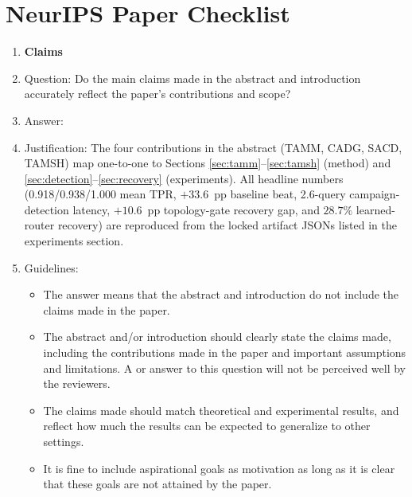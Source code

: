 \section*{NeurIPS Paper Checklist}

\begin{enumerate}

\item {\bf Claims}
    \item[] Question: Do the main claims made in the abstract and introduction accurately reflect the paper's contributions and scope?
    \item[] Answer: \answerYes{}
    \item[] Justification: The four contributions in the abstract (TAMM, CADG, SACD, TAMSH) map one-to-one to Sections \ref{sec:tamm}--\ref{sec:tamsh} (method) and \ref{sec:detection}--\ref{sec:recovery} (experiments). All headline numbers (0.918/0.938/1.000 mean TPR, $+33.6$~pp baseline beat, 2.6-query campaign-detection latency, $+10.6$~pp topology-gate recovery gap, and $28.7\%$ learned-router recovery) are reproduced from the locked artifact JSONs listed in the experiments section.
    \item[] Guidelines:
    \begin{itemize}
        \item The answer \answerNA{} means that the abstract and introduction do not include the claims made in the paper.
        \item The abstract and/or introduction should clearly state the claims made, including the contributions made in the paper and important assumptions and limitations. A \answerNo{} or \answerNA{} answer to this question will not be perceived well by the reviewers. 
        \item The claims made should match theoretical and experimental results, and reflect how much the results can be expected to generalize to other settings. 
        \item It is fine to include aspirational goals as motivation as long as it is clear that these goals are not attained by the paper. 
    \end{itemize}


\end{enumerate}
